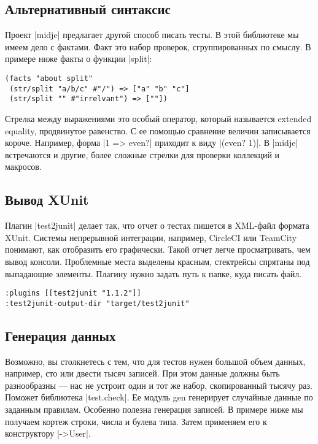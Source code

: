 \subsection{Альтернативный синтаксис}

Проект \spverb|midje| предлагает другой способ писать тесты. В этой библиотеке мы имеем
дело с фактами. Факт это набор проверок, сгруппированных по смыслу. В примере
ниже факты о функции \spverb|split|:

\begin{verbatim}
(facts "about split"
 (str/split "a/b/c" #"/") => ["a" "b" "c"]
 (str/split "" #"irrelvant") => [""])
\end{verbatim}

Стрелка между выражениями это особый оператор, который называется extended
equality, продвинутое равенство. С ее помощью сравнение величин записывается
короче. Например, форма \spverb|1 => even?| приходит к виду \spverb|(even? 1)|.
В \spverb|midje| встречаются и другие, более сложные стрелки для проверки коллекций и макросов.

\subsection{Вывод XUnit}

Плагин \spverb|test2junit|
делает так, что отчет о тестах пишется в XML-файл формата
XUnit. Системы непрерывной интеграции, например, CircleCI или TeamCity понимают,
как отобразить его графически. Такой отчет легче просматривать, чем вывод
консоли. Проблемные места выделены красным, стектрейсы спрятаны под выпадающие
элементы. Плагину нужно задать путь к папке, куда писать файл.

\begin{verbatim}
:plugins [[test2junit "1.1.2"]]
:test2junit-output-dir "target/test2junit"
\end{verbatim}

\subsection{Генерация данных}

Возможно, вы столкнетесь с тем, что для тестов нужен большой объем данных,
например, сто или двести тысяч записей. При этом данные должны быть разнообразны
— нас не устроит один и тот же набор, скопированный тысячу раз. Поможет
библиотека \spverb|test.check|. Ее модуль gen генерирует случайные данные по заданным
правилам. Особенно полезна генерация записей. В примере ниже мы получаем кортеж
строки, числа и булева типа. Затем применяем его к конструктору \spverb|->User|.

